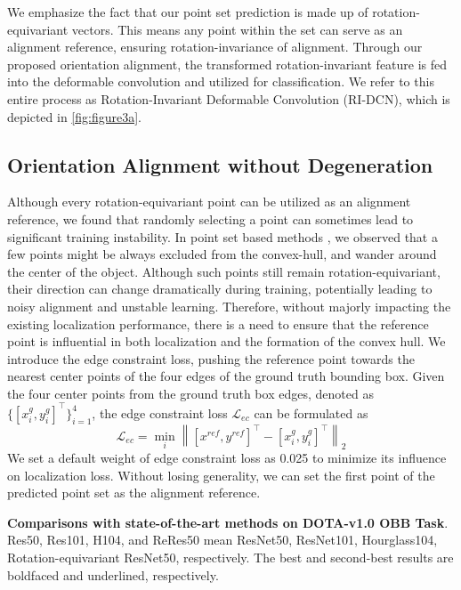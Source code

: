 \documentclass[letterpaper]{article} %
\begin{document}
We emphasize the fact that our point set prediction is made up of rotation-equivariant vectors. This means any point within the set can serve as an alignment reference, ensuring rotation-invariance of alignment.
Through our proposed orientation alignment, the transformed rotation-invariant feature is fed into the deformable convolution and utilized for classification. We refer to this entire process as Rotation-Invariant Deformable Convolution (RI-DCN), which is depicted in \cref{fig:figure3a}. %


\subsection{Orientation Alignment without Degeneration}
Although every rotation-equivariant point can be utilized as an alignment reference, we found that randomly selecting a point can sometimes lead to significant training instability. In point set based methods \citep{yang2019reppoints, guo2021beyond, li2022oriented}, we observed that a few points might be always excluded from the convex-hull, and wander around the center of the object. Although such points still remain rotation-equivariant, their direction can change dramatically during training, potentially leading to noisy alignment and unstable learning. Therefore, without majorly impacting the existing localization performance, there is a need to ensure that the reference point is influential in both localization and the formation of the convex hull. We introduce the edge constraint loss, pushing the reference point towards the nearest center points of the four edges of the ground truth bounding box. Given the four center points from the ground truth box edges, denoted as \( \{[x^g_i, y^g_i]^\top\}_{i=1}^4 \), the edge constraint loss \( \mathcal{L}_{ec}\) can be formulated as
\begin{equation}
    \mathcal{L}_{ec} = \min_i \left\lVert [x^{ref}, y^{ref}]^\top - [x^g_i, y^g_i]^\top \right\rVert_2
\end{equation}
We set a default weight of edge constraint loss as 0.025 to minimize its influence on localization loss. Without losing generality, we can set the first point of the predicted point set as the alignment reference.


\begin{table}[t]
   
    \caption{\textbf{Comparisons with state-of-the-art methods on DOTA-v1.0 OBB Task}. Res50, Res101, H104, and ReRes50 mean ResNet50, ResNet101, Hourglass104, Rotation-equivariant ResNet50, respectively. The best and second-best results are boldfaced and underlined, respectively.}
   \label{tab:dota_sota}
\end{table}
\end{document}
